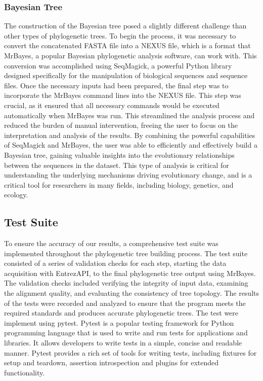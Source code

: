 \documentclass[12pt]{article}
\begin{document}
\subsubsection{Bayesian Tree}
The construction of the Bayesian tree posed a slightly different challenge than other types of phylogenetic trees. To begin the process, it was necessary to convert the concatenated FASTA file into a NEXUS file, which is a format that MrBayes, a popular Bayesian phylogenetic analysis software, can work with. This conversion was accomplished using SeqMagick, a powerful Python library designed specifically for the manipulation of biological sequences and sequence files.\newline
Once the necessary inputs had been prepared, the final step was to incorporate the MrBayes command lines into the NEXUS file. This step was crucial, as it ensured that all necessary commands would be executed automatically when MrBayes was run. This streamlined the analysis process and reduced the burden of manual intervention, freeing the user to focus on the interpretation and analysis of the results.\newline
By combining the powerful capabilities of SeqMagick and MrBayes, the user was able to efficiently and effectively build a Bayesian tree, gaining valuable insights into the evolutionary relationships between the sequences in the dataset. This type of analysis is critical for understanding the underlying mechanisms driving evolutionary change, and is a critical tool for researchers in many fields, including biology, genetics, and ecology.
\subsection{Test Suite}
To ensure the accuracy of our results, a comprehensive test suite was implemented throughout the phylogenetic tree building process. The test suite consisted of a series of validation checks for each step, starting the data acquisition with EntrezAPI, to the final phylogenetic tree output using MrBayes. The validation checks included verifying the integrity of input data, examining the alignment quality, and evaluating the consistency of tree topology. The results of the tests were recorded and analyzed to ensure that the program meets the required standards and produces accurate phylogenetic trees. The test were implement using pytest. Pytest is a popular testing framework for Python programming language that is used to write and run tests for applications and libraries. It allows developers to write tests in a simple, concise and readable manner. Pytest provides a rich set of tools for writing tests, including fixtures for setup and teardown, assertion introspection and plugins for extended functionality.
\end{document}
